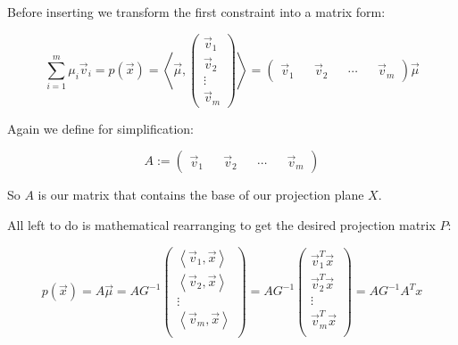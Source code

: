 \documentclass{article}
\newcommand{\lrangle}[1]{\left\langle #1 \right\rangle}
\begin{document}
Before inserting we transform the first constraint into a matrix form:

    \begin{equation}
        \sum_{i=1}^{m}{\mu _i \vec{v}_i} = p(\vec{x}) =
        \lrangle{\vec{\mu},
        \begin{pmatrix}
            \vec{v}_1 \\
            \vec{v}_2 \\
            \vdots \\
            \vec{v}_m
        \end{pmatrix}
        } =
        \begin{pmatrix}
            \vec{v}_1 &&
            \vec{v}_2 &&
            \cdots &&
            \vec{v}_m
        \end{pmatrix}
        \vec{\mu}
    \end{equation}

Again we define for simplification:

    \begin{equation}
        A :=
        \begin{pmatrix}
            \vec{v}_1 &&
            \vec{v}_2 &&
            \cdots &&
            \vec{v}_m
        \end{pmatrix}
    \end{equation}

So \(A\) is our matrix that contains the base of our projection plane \(X\).

All left to do is mathematical rearranging to get the desired projection matrix
\(P\):

    \begin{equation}
        p(\vec{x}) = A\vec{\mu} = AG^{-1}
        \begin{pmatrix}
            \lrangle{ \vec{v}_1, \vec{x} } \\
            \lrangle{ \vec{v}_2, \vec{x} } \\
            \vdots \\
            \lrangle{ \vec{v}_m, \vec{x} } \\
            \end{pmatrix}
        = AG^{-1}
        \begin{pmatrix}
            \vec{v}_{1}^{T} \vec{x} \\
            \vec{v}_{2}^{T} \vec{x} \\
            \vdots \\
            \vec{v}_{m}^{T} \vec{x} \\
        \end{pmatrix}
        = AG^{-1}A^T x
    \end{equation}
\end{document}
